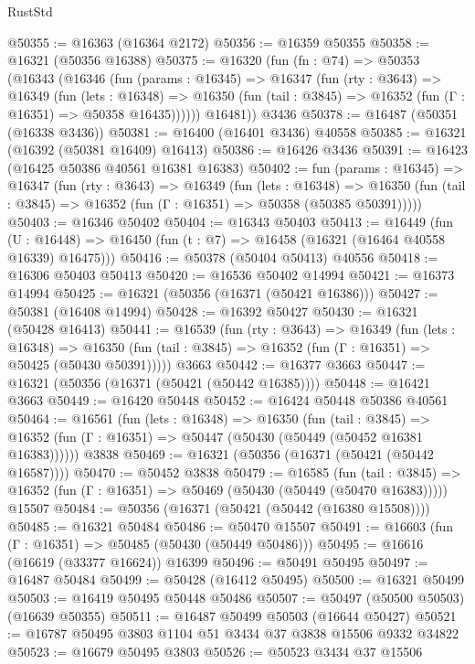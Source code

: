 \begin{lexlean}{RustStd}
\begin{coremodule}
@50355 := @16363 (@16364 @2172)
@50356 := @16359 @50355
@50358 := @16321 (@50356 @16388)
@50375 := @16320
    (fun (fn : @74) =>
    @50353
      (@16343
        (@16346
          (fun (params : @16345) =>
          @16347
            (fun (rty : @3643) =>
            @16349
              (fun (lets : @16348) =>
              @16350 (fun (tail : @3845) => @16352 (fun (Γ : @16351) => @50358 @16435))))))
        @16481))
    @3436
@50378 := @16487 (@50351 (@16338 @3436))
@50381 := @16400 (@16401 @3436) @40558
@50385 := @16321 (@16392 (@50381 @16409) @16413)
@50386 := @16426 @3436
@50391 := @16423 (@16425 @50386 @40561 @16381 @16383)
@50402 := fun (params : @16345) =>
  @16347
    (fun (rty : @3643) =>
    @16349
      (fun (lets : @16348) =>
      @16350 (fun (tail : @3845) => @16352 (fun (Γ : @16351) => @50358 (@50385 @50391)))))
@50403 := @16346 @50402
@50404 := @16343 @50403
@50413 := @16449
    (fun (U : @16448) => @16450 (fun (t : @7) => @16458 (@16321 (@16464 @40558 @16339) @16475)))
@50416 := @50378 (@50404 @50413) @40556
@50418 := @16306 @50403 @50413
@50420 := @16536 @50402 @14994
@50421 := @16373 @14994
@50425 := @16321 (@50356 (@16371 (@50421 @16386)))
@50427 := @50381 (@16408 @14994)
@50428 := @16392 @50427
@50430 := @16321 (@50428 @16413)
@50441 := @16539
    (fun (rty : @3643) =>
    @16349
      (fun (lets : @16348) =>
      @16350 (fun (tail : @3845) => @16352 (fun (Γ : @16351) => @50425 (@50430 @50391)))))
    @3663
@50442 := @16377 @3663
@50447 := @16321 (@50356 (@16371 (@50421 (@50442 @16385))))
@50448 := @16421 @3663
@50449 := @16420 @50448
@50452 := @16424 @50448 @50386 @40561
@50464 := @16561
    (fun (lets : @16348) =>
    @16350
      (fun (tail : @3845) =>
      @16352 (fun (Γ : @16351) => @50447 (@50430 (@50449 (@50452 @16381 @16383))))))
    @3838
@50469 := @16321 (@50356 (@16371 (@50421 (@50442 @16587))))
@50470 := @50452 @3838
@50479 := @16585
    (fun (tail : @3845) => @16352 (fun (Γ : @16351) => @50469 (@50430 (@50449 (@50470 @16383)))))
    @15507
@50484 := @50356 (@16371 (@50421 (@50442 (@16380 @15508))))
@50485 := @16321 @50484
@50486 := @50470 @15507
@50491 := @16603 (fun (Γ : @16351) => @50485 (@50430 (@50449 @50486)))
@50495 := @16616 (@16619 (@33377 @16624)) @16399
@50496 := @50491 @50495
@50497 := @16487 @50484
@50499 := @50428 (@16412 @50495)
@50500 := @16321 @50499
@50503 := @16419 @50495 @50448 @50486
@50507 := @50497 (@50500 @50503) (@16639 @50355)
@50511 := @16487 @50499 @50503 (@16644 @50427)
@50521 := @16787 @50495 @3803 @1104 @51 @3434 @37 @3838 @15506 @9332 @34822
@50523 := @16679 @50495 @3803
@50526 := @50523 @3434 @37 @15506

\end{coremodule}
\end{lexlean}
